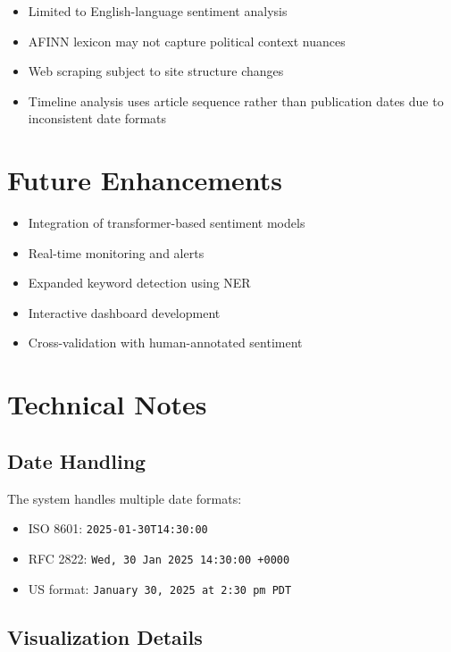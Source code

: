 \documentclass[11pt]{article}
\begin{document}
\begin{itemize}
    \item Limited to English-language sentiment analysis
    \item AFINN lexicon may not capture political context nuances
    \item Web scraping subject to site structure changes
    \item Timeline analysis uses article sequence rather than publication dates due to inconsistent date formats
\end{itemize}

\section{Future Enhancements}

\begin{itemize}
    \item Integration of transformer-based sentiment models
    \item Real-time monitoring and alerts
    \item Expanded keyword detection using NER
    \item Interactive dashboard development
    \item Cross-validation with human-annotated sentiment
\end{itemize}

\section{Technical Notes}

\subsection{Date Handling}

The system handles multiple date formats:
\begin{itemize}
    \item ISO 8601: \texttt{2025-01-30T14:30:00}
    \item RFC 2822: \texttt{Wed, 30 Jan 2025 14:30:00 +0000}
    \item US format: \texttt{January 30, 2025 at 2:30 pm PDT}
\end{itemize}

\subsection{Visualization Details}
\end{document}

